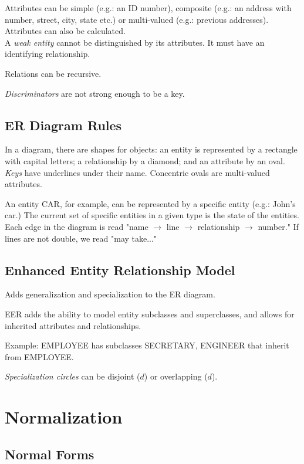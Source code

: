 \documentclass[english,openany]{book}
\begin{document}
    Attributes can be simple (e.g.: an ID number), composite (e.g.: an address with number, street, city, state etc.) or multi-valued (e.g.: previous addresses). Attributes can also be calculated.\\

    A \textit{weak entity} cannot be distinguished by its attributes. It must have an identifying relationship.

    Relations can be recursive.

    \textit{Discriminators} are not strong enough to be a key.

    \section{ER Diagram Rules}

    In a diagram, there are shapes for objects: an entity is represented by a rectangle with capital letters; a relationship by a diamond; and an attribute by an oval. \textit{Keys} have underlines under their name. Concentric ovals are multi-valued attributes.

    An entity CAR, for example, can be represented by a specific entity (e.g.: John's car.) The current set of specific entities in a given type is the state of the entities.\\

    Each edge in the diagram is read "name $\rightarrow$ line $\rightarrow$ relationship $\rightarrow$ number." If lines are not double, we read "may take..."

    \section{Enhanced Entity Relationship Model}

    Adds generalization and specialization to the ER diagram.

    EER adds the ability to model entity subclasses and superclasses, and allows for inherited attributes and relationships.

    Example: EMPLOYEE has subclasses SECRETARY, ENGINEER that inherit from EMPLOYEE.

    \textit{Specialization circles} can be disjoint ($d$) or overlapping ($d$).

    \chapter{Normalization}

    \section{Normal Forms}
\end{document}
